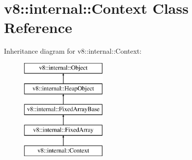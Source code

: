 \hypertarget{classv8_1_1internal_1_1_context}{}\section{v8\+:\+:internal\+:\+:Context Class Reference}
\label{classv8_1_1internal_1_1_context}
Inheritance diagram for v8\+:\+:internal\+:\+:Context\+:\begin{figure}[H]
\begin{center}
\leavevmode
\includegraphics[height=5.000000cm]{classv8_1_1internal_1_1_context}
\end{center}
\end{figure}

